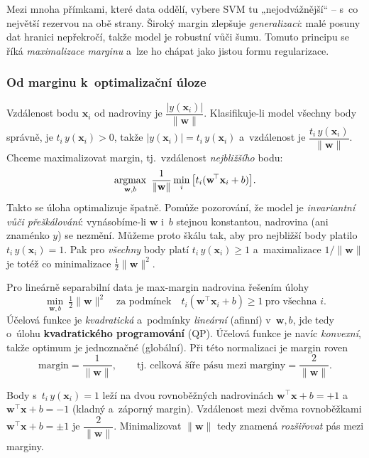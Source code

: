 \begin{intuice}
Mezi mnoha přímkami, které data oddělí, vybere SVM tu „nejodvážnější`` -- s~co největší rezervou na obě strany. Široký margin zlepšuje \emph{generalizaci}: malé posuny dat hranici nepřekročí, takže model je robustní vůči šumu. Tomuto principu se říká \emph{maximalizace marginu} a~lze ho chápat jako jistou formu regularizace.
\end{intuice}

\subsubsection*{Od marginu k~optimalizační úloze}

Vzdálenost bodu $\mathbf{x}_i$ od nadroviny je $\dfrac{|y(\mathbf{x}_i)|}{\|\mathbf{w}\|}$. Klasifikuje-li model všechny body správně, je $t_i\,y(\mathbf{x}_i)>0$, takže $|y(\mathbf{x}_i)| = t_i\,y(\mathbf{x}_i)$ a~vzdálenost je $\dfrac{t_i\,y(\mathbf{x}_i)}{\|\mathbf{w}\|}$. Chceme maximalizovat margin, tj.\ vzdálenost \emph{nejbližšího} bodu:
\[ \argmax_{\mathbf{w},b}\ \frac{1}{\|\mathbf{w}\|}\min_i\big[t_i(\mathbf{w}^{\!\top}\mathbf{x}_i+b)\big]. \]
Takto se úloha optimalizuje špatně. Pomůže pozorování, že model je \emph{invariantní vůči přeškálování}: vynásobíme-li $\mathbf{w}$ i~$b$ stejnou konstantou, nadrovina (ani znaménko $y$) se nezmění. Můžeme proto škálu  tak, aby pro nejbližší body platilo $t_i\,y(\mathbf{x}_i)=1$. Pak pro \emph{všechny} body platí $t_i\,y(\mathbf{x}_i)\ge 1$ a~maximalizace $1/\|\mathbf{w}\|$ je totéž co minimalizace $\tfrac12\|\mathbf{w}\|^2$.

\begin{veta}
Pro lineárně separabilní data je max-margin nadrovina řešením úlohy
\[ \boxed{\ \min_{\mathbf{w},b}\ \tfrac12\|\mathbf{w}\|^2 \quad\text{za podmínek}\quad t_i(\mathbf{w}^{\!\top}\mathbf{x}_i+b)\ge 1\ \text{pro všechna }i.\ } \]
Účelová funkce je \emph{kvadratická} a~podmínky \emph{lineární} (afinní) v~$\mathbf{w},b$, jde tedy o~úlohu \textbf{kvadratického programování} (QP). Účelová funkce je navíc \emph{konvexní}, takže optimum je jednoznačné (globální). Při této normalizaci je margin roven
\[ \text{margin} = \frac{1}{\|\mathbf{w}\|},\qquad \text{tj.\ celková šíře pásu mezi marginy} = \frac{2}{\|\mathbf{w}\|}. \]
\end{veta}

\begin{intuice}
Body s~$t_i\,y(\mathbf{x}_i)=1$ leží na dvou rovnoběžných nadrovinách $\mathbf{w}^{\!\top}\mathbf{x}+b=+1$ a~$\mathbf{w}^{\!\top}\mathbf{x}+b=-1$ (kladný a~záporný margin). Vzdálenost mezi dvěma rovnoběžkami $\mathbf{w}^{\!\top}\mathbf{x}+b=\pm1$ je $\dfrac{2}{\|\mathbf{w}\|}$. Minimalizovat $\|\mathbf{w}\|$ tedy znamená \emph{rozšiřovat} pás mezi marginy.
\end{intuice}

